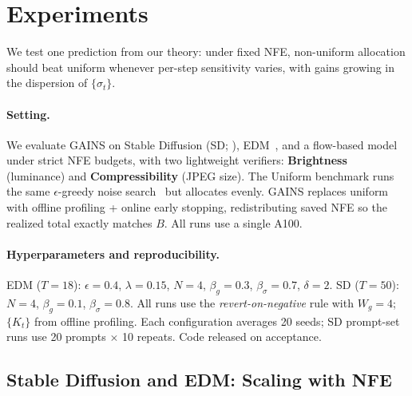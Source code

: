 \section{Experiments}
\label{sec:experiments}

We test one prediction from our theory: under fixed NFE, non-uniform allocation should beat uniform whenever per-step sensitivity varies, with gains growing in the dispersion of $\{\sigma_t\}$.

\paragraph{Setting.}
We evaluate \textsc{GAINS} on Stable Diffusion (SD; \citealp{rombach2022high}), EDM~\citep{karras2022elucidating}, and a flow-based model under strict NFE budgets, with two lightweight verifiers: \textbf{Brightness} (luminance) and \textbf{Compressibility} (JPEG size). The Uniform benchmark runs the same $\epsilon$-greedy noise search~\citep{ramesh2025nts} but allocates evenly. \textsc{GAINS} replaces uniform with offline profiling + online early stopping, redistributing saved NFE so the realized total exactly matches $B$. All runs use a single A100.

\paragraph{Hyperparameters and reproducibility.}
EDM ($T=18$): $\epsilon = 0.4$, $\lambda = 0.15$, $N = 4$, $\beta_g = 0.3$, $\beta_\sigma = 0.7$, $\delta = 2$. SD ($T=50$): $N = 4$, $\beta_g = 0.1$, $\beta_\sigma = 0.8$. All runs use the \emph{revert-on-negative} rule with $W_g = 4$; $\{K_t\}$ from offline profiling. Each configuration averages 20 seeds; SD prompt-set runs use 20 prompts $\times$ 10 repeats. Code released on acceptance.

\subsection{Stable Diffusion and EDM: Scaling with NFE}
\label{sec:exp-sd-edm-scaling}

